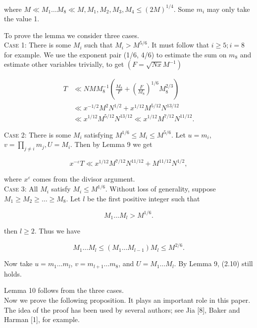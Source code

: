 \documentclass[10pt]{article}
\begin{document}
where $M \ll M_{1} \ldots M_{8} \ll M, M_{1}, M_{2}, M_{3}, M_{4} \leq(2 M)^{1 / 4}$. Some $m_{i}$ may only take the value 1.

To prove the lemma we consider three cases.\\
\medskip\noindent\textsc{Case 1:} There is some $M_{i}$ such that $M_{i}>M^{5 / 6}$. It must follow that $i \geq 5 ; i=8$ for example. We use the exponent pair (1/6, 4/6) to estimate the sum on $m_{8}$ and estimate other variables trivially, to get $\left(F=\sqrt{N x} M^{-1}\right)$


\begin{align*}
T & \ll N M M_{8}^{-1}\left(\frac{M_{8}}{F}+\left(\frac{F}{M_{8}}\right)^{1 / 6} M_{8}^{2 / 3}\right)  \tag{2.9}\\
& \ll x^{-1 / 2} M^{2} N^{1 / 2}+x^{1 / 12} M^{5 / 12} N^{13 / 12} \\
& \ll x^{1 / 12} M^{5 / 12} N^{13 / 12} \ll x^{1 / 12} M^{7 / 12} N^{11 / 12}.
\end{align*}


\medskip\noindent\textsc{Case 2:} There is some $M_{i}$ satisfying $M^{1 / 6} \leq M_{i} \leq M^{5 / 6}$. Let $u=m_{i}$, $v=\prod_{j \neq i} m_{j}, U=M_{i}$. Then by Lemma 9 we get


\begin{equation*}
x^{-\varepsilon} T \ll x^{1 / 12} M^{7 / 12} N^{11 / 12}+M^{11 / 12} N^{1 / 2}, \tag{2.10}
\end{equation*}


where $x^{\varepsilon}$ comes from the divisor argument.\\
\medskip\noindent\textsc{Case 3:} All $M_{i}$ satisfy $M_{i} \leq M^{1 / 6}$. Without loss of generality, suppose $M_{1} \geq M_{2} \geq \ldots \geq M_{8}$. Let $l$ be the first positive integer such that


\begin{equation*}
M_{1} \ldots M_{l}>M^{1 / 6}. \tag{2.11}
\end{equation*}


then $l \geq 2$. Thus we have

$$
M_{1} \ldots M_{l} \leq\left(M_{1} \ldots M_{l-1}\right) M_{l} \leq M^{2 / 6}.
$$

Now take $u=m_{1} \ldots m_{l}$, $v=m_{l+1} \ldots m_{8}$, and $U=M_{1} \ldots M_{l}$. By Lemma 9, (2.10) still holds.

Lemma 10 follows from the three cases.\\[0pt]
Now we prove the following proposition. It plays an important role in this paper. The idea of the proof has been used by several authors; see Jia [8], Baker and Harman [1], for example.
\end{document}
